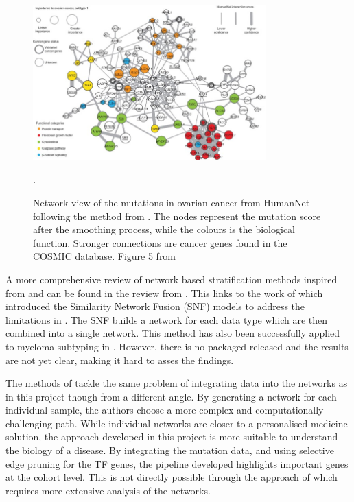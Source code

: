 \begin{figure}[!htb]
\centering\includegraphics[width=0.8\textwidth,height=0.8\textheight,keepaspectratio]{Sections/Lit_review/Resources/hofree_fig_5.jpg}
    \caption{Network view of the mutations in ovarian cancer from HumanNet following the method from \citet{Hofree2013-ld}. The nodes represent the mutation score after the smoothing process, while the colours is the biological function. Stronger connections are cancer genes found in the COSMIC database. Figure 5 from \citet{Hofree2013-ld}}.
    \label{fig:lit:hofree}
\end{figure}



A more comprehensive review of network based stratification methods inspired from \citet{Hofree2013-ld} and \citet{He2017-dj} can be found in the review from \citet{Petti2023-qo}. This links to the work of \citet{Wang2014-wr} which introduced the Similarity Network Fusion (SNF) models to address the limitations in \citet{Hofree2013-ld}. The SNF builds a network for each data type which are then combined into a single network. This method has also been successfully applied to myeloma subtyping in \citet{Bhalla2021-uv}. However, there is no packaged released and the results are not yet clear, making it hard to asses the findings.

The methods of \citet{Hofree2013-ld, He2017-dj} tackle the same problem of integrating data into the networks as in this project though from a different angle. By generating a network for each individual sample, the authors choose a more complex and computationally challenging path. While individual networks are closer to a personalised medicine solution, the approach developed in this project is more suitable to understand the biology of a disease. By integrating the mutation data, and using selective edge pruning for the TF genes, the pipeline developed highlights important genes at the cohort level. This is not directly possible through the approach of \citet{Hofree2013-ld, He2017-dj} which requires more extensive analysis of the networks.




